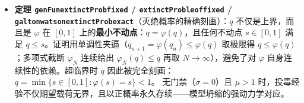 \documentclass[
]{ctexart}
\providecommand{\tightlist}{%
  \setlength{\itemsep}{0pt}\setlength{\parskip}{0pt}}
\renewcommand{\_}{\discretionary{}{}{\textunderscore}}
\begin{document}
\begin{itemize}
  \begin{itemize}
  \tightlist
  \item
    定义 \texttt{genFun(s)\ =\ Σ\ p\_k\ s\^{}k}，证明其在 \([0,1]\)
    上单调、有界，\texttt{genFun(1)=1}；截断多项式 \texttt{genFun\_N}
    连续可导且
    \texttt{genFun\_N\textquotesingle{}(1)\ →\ m\ \textgreater{}\ 1}；
  \item
    \textbf{核心引理 \texttt{exists\_lt\_sub\_id}}：由
    \texttt{genFun\textquotesingle{}(1)\textgreater{}1}
    与连续性，取截断多项式 \texttt{genFun\_N} 使
    \texttt{genFun\_N\textquotesingle{}(s\$\_\{0\}\$)\textgreater{}1}，经
    MVT 与尾部估计推出存在 \(s₀<1\) 使
    \texttt{genFun(s\$\_\{0\}\$)\textless{}s\$\_\{0\}\$}；
  \item
    灭绝概率迭代 \(q_n = \varphi^n(0)\) 单调递增且被 \(s₀\)
    一致上界，故其极限 \(q = \sup q_n \le s₀ < 1\)。
  \end{itemize}
\item
  \textbf{定理 \texttt{genFun\_extinctProb\_fixed} /
  \texttt{extinctProb\_le\_of\_fixed} /
  \texttt{galton\_watson\_extinctProb\_exact}}（灭绝概率的精确刻画）：\(q\)
  不仅是上界，而且是 \(\varphi\) 在 \([0,1]\)
  上的\textbf{最小不动点}：\(q = \varphi(q)\)，且任何不动点
  \(s\in[0,1]\) 满足
  \(q \le s\)。证明用单调性夹逼（\(q_{n+1}=\varphi(q_n)\le\varphi(q)\)
  取极限得 \(q\le\varphi(q)\)；多项式截断 \(\varphi_N\) 连续给出
  \(\varphi_N(q)\le q\) 再取 \(N\to\infty\)），避免了对 \(\varphi\)
  自身连续性的依赖。超临界时 \(q\)
  因此被完全刻画：\(q = \min\{s\in[0,1] : \varphi(s)=s\} < 1\)。
  无门禁（\(\sigma=0\)）且 \(\mu>1\)
  时，投毒经验不仅期望载荷无界，且以正概率永久存续------模型坍缩的强动力学对应。
\end{itemize}
\end{document}
